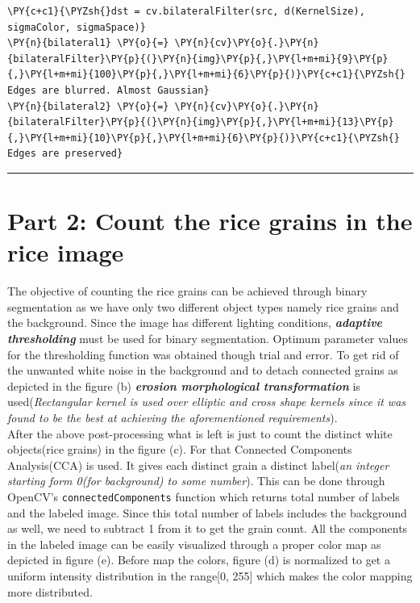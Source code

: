 \documentclass[a4paper,10pt]{article}%
\begin{document}
    \begin{tcolorbox}[breakable, size=fbox, boxrule=1pt, pad at break*=1mm,colback=cellbackground, colframe=cellborder]
\begin{Verbatim}[commandchars=\\\{\}]
\PY{c+c1}{\PYZsh{}dst = cv.bilateralFilter(src, d(KernelSize), sigmaColor, sigmaSpace)}
\PY{n}{bilateral1} \PY{o}{=} \PY{n}{cv}\PY{o}{.}\PY{n}{bilateralFilter}\PY{p}{(}\PY{n}{img}\PY{p}{,}\PY{l+m+mi}{9}\PY{p}{,}\PY{l+m+mi}{100}\PY{p}{,}\PY{l+m+mi}{6}\PY{p}{)}\PY{c+c1}{\PYZsh{} Edges are blurred. Almost Gaussian} 
\PY{n}{bilateral2} \PY{o}{=} \PY{n}{cv}\PY{o}{.}\PY{n}{bilateralFilter}\PY{p}{(}\PY{n}{img}\PY{p}{,}\PY{l+m+mi}{13}\PY{p}{,}\PY{l+m+mi}{10}\PY{p}{,}\PY{l+m+mi}{6}\PY{p}{)}\PY{c+c1}{\PYZsh{} Edges are preserved} 
\end{Verbatim}
\end{tcolorbox}

\vspace{5mm}
\hrule

\section{Part 2: Count the rice grains in the rice image}

The objective of counting the rice grains can be achieved through binary segmentation as we have only two different object types namely rice grains and the background. Since the image has different lighting conditions, \textbf{\textit{adaptive thresholding}} must be used for binary segmentation. Optimum parameter values for the thresholding function was obtained though trial and error. To get rid of the unwanted white noise in the background and to detach connected grains as depicted in the figure (b) \textbf{\textit{erosion morphological transformation}} is used(\textit{Rectangular kernel is used over elliptic and cross shape kernels since it was found to be the best at achieving the aforementioned requirements}).\\

After the above post-processing what is left is just to count the distinct white objects(rice grains) in the figure (c). For that Connected Components Analysis(CCA) is used. It gives each distinct grain a distinct label(\textit{an integer starting form 0(for background) to some number}). This can be done through OpenCV's {\tt connectedComponents} function which returns total number of labels and the labeled image. Since this total number of labels includes the background as well, we need to subtract 1 from it to get the grain  count. All the components in the labeled image can be easily visualized through a proper color map as depicted in figure (e). Before map the colors, figure (d) is normalized to get a uniform intensity distribution in the range[0, 255] which makes the color mapping more distributed.\\
\end{document}
